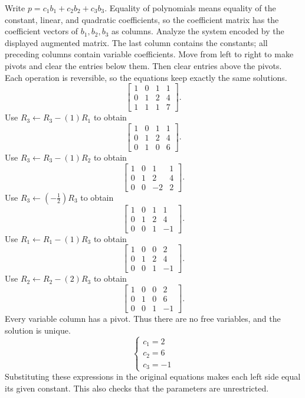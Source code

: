Write $p=c_1b_1+c_2b_2+c_3b_3$. Equality of polynomials means equality of the constant, linear, and quadratic coefficients, so the coefficient matrix has the coefficient vectors of $b_1,b_2,b_3$ as columns.
\goal Analyze the system encoded by the displayed augmented matrix. The last column contains the constants; all preceding columns contain variable coefficients.
\idea Move from left to right to make pivots and clear the entries below them. Then clear entries above the pivots. Each operation is reversible, so the equations keep exactly the same solutions.
\[ \left[\begin{array}{rrr|r}1&0&1&1\\0&1&2&4\\1&1&1&7\end{array}\right].\]
Use $R_{3}\leftarrow R_{3}-(1)R_{1}$ to obtain
\[ \left[\begin{array}{rrr|r}1&0&1&1\\0&1&2&4\\0&1&0&6\end{array}\right].\]
Use $R_{3}\leftarrow R_{3}-(1)R_{2}$ to obtain
\[ \left[\begin{array}{rrr|r}1&0&1&1\\0&1&2&4\\0&0&-2&2\end{array}\right].\]
Use $R_{3}\leftarrow(- \frac{1}{2})R_{3}$ to obtain
\[ \left[\begin{array}{rrr|r}1&0&1&1\\0&1&2&4\\0&0&1&-1\end{array}\right].\]
Use $R_{1}\leftarrow R_{1}-(1)R_{3}$ to obtain
\[ \left[\begin{array}{rrr|r}1&0&0&2\\0&1&2&4\\0&0&1&-1\end{array}\right].\]
Use $R_{2}\leftarrow R_{2}-(2)R_{3}$ to obtain
\[ \left[\begin{array}{rrr|r}1&0&0&2\\0&1&0&6\\0&0&1&-1\end{array}\right].\]
Every variable column has a pivot. Thus there are no free variables, and the solution is unique.
\[ \begin{cases}c_{1}=2\\c_{2}=6\\c_{3}=-1\end{cases}\]
Substituting these expressions in the original equations makes each left side equal its given constant. This also checks that the parameters are unrestricted.

